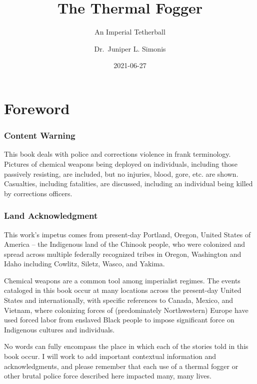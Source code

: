 \documentclass[
  11pt,
]{krantz}
\title{The Thermal Fogger}
\subtitle{An Imperial Tetherball}
\author{Dr.~Juniper L. Simonis}
\date{2021-06-27}
\begin{document}
\maketitle


\setlength{\abovedisplayskip}{-5pt}
\setlength{\abovedisplayshortskip}{-5pt}

{
\hypersetup{linkcolor=}
\setcounter{tocdepth}{2}
\tableofcontents
}
\listoffigures
\hypertarget{foreword}{%
\chapter*{Foreword}\label{foreword}}


\hypertarget{content-warning}{%
\subsection*{Content Warning}\label{content-warning}}


This book deals with police and corrections violence in frank terminology.
Pictures of chemical weapons being deployed on individuals, including those passively resisting, are included, but no injuries, blood, gore, etc. are shown.
Casualties, including fatalities, are discussed, including an individual being killed by corrections officers.

\hypertarget{land-acknowledgment}{%
\subsection*{Land Acknowledgment}\label{land-acknowledgment}}


This work's impetus comes from present-day Portland, Oregon, United States of America -- the Indigenous land of the Chinook people, who were colonized and spread across multiple federally recognized tribes in Oregon, Washington and Idaho including Cowlitz, Siletz, Wasco, and Yakima.

Chemical weapons are a common tool among imperialist regimes.
The events cataloged in this book occur at many locations across the present-day United States and internationally, with specific references to Canada, Mexico, and Vietnam, where colonizing forces of (predominately Northwestern) Europe have used forced labor from enslaved Black people to impose significant force on Indigenous cultures and individuals.

No words can fully encompass the place in which each of the stories told in this book occur.
I will work to add important contextual information and acknowledgments, and please remember that each use of a thermal fogger or other brutal police force described here impacted many, many lives.
\end{document}
